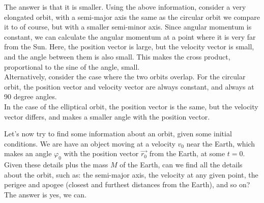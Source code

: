 The answer is that it is smaller. Using the above information, consider a very elongated orbit, with a semi-major axis the same as the circular orbit we compare it to of course, but with a smaller semi-minor axis. Since angular momentum is constant, we can calculate the angular momentum at a point where it is very far from the Sun. Here, the position vector is large, but the velocity vector is small, and the angle between them is also small. This makes the cross product, proportional to the sine of the angle, small.\\
Alternatively, consider the case where the two orbits overlap. For the circular orbit, the position vector and velocity vector are always constant, and always at 90 degree angles.\\
In the case of the elliptical orbit, the position vector is the same, but the velocity vector differs, and makes a smaller angle with the position vector.

Let's now try to find some information about an orbit, given some initial conditions. We are have an object moving at a velocity $v_0$ near the Earth, which makes an angle $\varphi_0$ with the position vector $\vec{r_0}$ from the Earth, at some $t = 0$. Given these details plus the mass $M$ of the Earth, can we find all the details about the orbit, such as: the semi-major axis, the velocity at any given point, the perigee and apogee (closest and furthest distances from the Earth), and so on? The answer is yes, we can.\\

\begin{figure}[H]
  \centering
{}
\end{figure}


